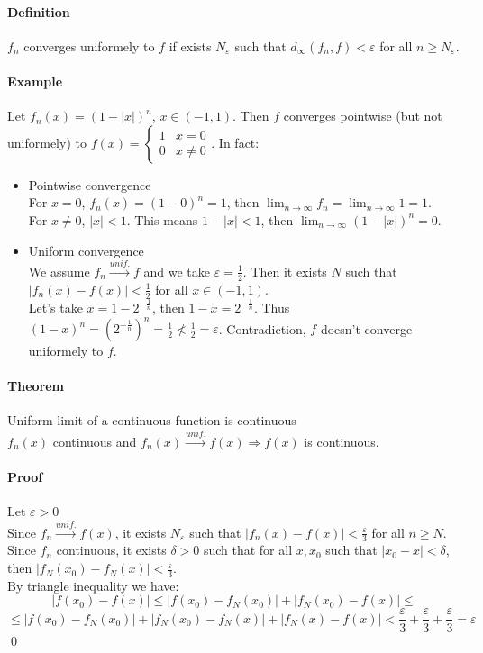 \documentclass{article}
\newcommand{\abs}[1]{\left|#1\right|}
\newcommand{\limn}{\lim_{n \to \infty}}
\newcommand{\tounif}{\xrightarrow{unif.}}
\newcommand{\DS}{\displaystyle}
\newcommand{\intoo}[1]{\left(#1\right)}
\newcommand{\Ep}{\varepsilon}
\newcommand{\Def}{\paragraph{Definition}}
\newcommand{\Theorem}{\paragraph{Theorem}}
\newcommand{\Proof}{\paragraph{Proof}}
\newcommand{\Example}{\paragraph{Example}}
\begin{document}
	\Def $f_n$ converges uniformely to $f$ if exists $N_\Ep$ such that
	$d_\infty(f_n,f) < \Ep$ for all $n \geq N_\Ep$.

	\Example Let $f_n(x) = (1 - \abs{x})^n$, $x \in \intoo{-1,1}$. Then $f$
	converges pointwise (but not uniformely) to $f(x) =
	\begin{cases}1 & x = 0 \\ 0 & x \neq 0\end{cases}$. In fact:
\begin{itemize}
	\item Pointwise convergence
\\For $x = 0$, $f_n(x) = (1 - 0)^n = 1$, then $\DS \limn{f_n} = \limn{1} = 1$.
\\For $x \neq 0$, $\abs{x} < 1$. This means $1 - |x| < 1$, then
	$\DS \limn{(1-|x|)^n} = 0$.

	\item Uniform convergence
\\We assume $f_n \tounif f$ and we take $\Ep = \frac{1}{2}$. Then it exists $N$
	such that $\abs{f_n(x) - f(x)} < \frac{1}{2}$ for all $x \in \intoo{-1,1}$.
\\Let's take $x = 1 - 2^{-\frac{1}{n}}$, then $1 - x = 2^{-\frac{1}{n}}$. Thus
	$(1 - x)^n = (2^{-\frac{1}{n}})^n = \frac{1}{2} \nless \frac{1}{2} = \Ep$.
	Contradiction, $f$ doesn't converge uniformely to $f$.
\end{itemize}

	\Theorem Uniform limit of a continuous function is continuous
\\$f_n(x)$ continuous and $f_n(x) \tounif f(x) \Rightarrow f(x)$ is continuous.

	\Proof Let $\Ep > 0$
\\Since $f_n \tounif f(x)$, it exists $N_\Ep$ such that $\abs{f_n(x)-f(x)} <
	\frac{\Ep}{3}$ for all $n \geq N$.
\\Since $f_n$ continuous, it exists $\delta > 0$ such that for all $x,x_0$ such
	that $\abs{x_0 - x} < \delta$, then $\abs{f_N(x_0) - f_N(x)} < \frac{\Ep}{3}$.
\\By triangle inequality we have:
\begin{equation*}
	\abs{f(x_0) - f(x)} \leq \abs{f(x_0) - f_N(x_0)} + \abs{f_N(x_0) - f(x)} \leq
\end{equation*}
\begin{equation*} \leq
	\abs{f(x_0) - f_N(x_0)} + \abs{f_N(x_0) - f_N(x)} + \abs{f_N(x) - f(x)} <
	\frac{\Ep}{3} + \frac{\Ep}{3} + \frac{\Ep}{3} = \Ep
\end{equation*}
	\qed
\end{document}
